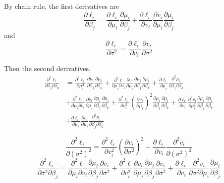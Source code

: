 \documentclass{article}
\begin{document}
\begin{enumerate}[leftmargin = 0 em, label = \arabic*., font = \bfseries]
	By chain rule, the first derivatives are
	\[\frac{\partial \ell_i}{\partial \beta_j} = \frac{\partial \ell_i}{\partial \mu_i} \frac{\partial \mu_i}{\partial \beta_j} + \frac{\partial \ell_i}{\partial v_i} \frac{\partial v_i}{\partial \mu_i} \frac{\partial \mu_i}{\partial \beta_j}\]
    and 
    \[\frac{\partial \ell_i}{\partial \sigma^2} = \frac{\partial \ell_i}{\partial v_i} \frac{\partial v_i}{\partial \sigma^2}\]

    Then the second derivatives,
    \begin{align*}
    \frac{\partial^2 \ell_i}{\partial \beta_j \partial \beta_k} &= \frac{\partial^2 \ell_i}{\partial \mu_i^2} \frac{\partial \mu_i}{\partial \beta_j} \frac{\partial \mu_i}{\partial \beta_k} + \frac{\partial^2 \ell}{\partial \mu_i \partial v_i} \frac{\partial v_i}{\partial \mu_i} \frac{\partial \mu_i}{\partial \beta_j} \frac{\partial \mu_i}{\partial \beta_k} + \frac{\partial \ell_i}{\partial \mu_i} \frac{\partial^2 \mu_i}{\partial \beta_j \partial \beta_k}\\
    & + \frac{\partial^2 \ell_{i}}{\partial \mu_i \partial v_i} \frac{\partial v_i}{\partial \mu_i} \frac{\partial \mu_i}{\partial \beta_j} \frac{\partial \mu_i}{\partial \beta_k} + \frac{\partial^2 \ell_{i}}{\partial v_i^2} \left(\frac{\partial v_i}{\partial \mu_i}\right)^2 \frac{\partial \mu_i}{\partial \beta_j} \frac{\partial \mu_i}{\partial \beta_k} + \frac{\partial \ell_i}{\partial v_i} \frac{\partial^2 v_i}{\partial \mu_i^2} \frac{\partial \mu_i}{\partial \beta_j} \frac{\partial \mu_i}{\partial \beta_k}\\
    & + \frac{\partial \ell_i}{\partial \mu_i} \frac{\partial v_i}{\partial \mu_i} \frac{\partial^2 \mu_i}{\partial \beta_j \partial \beta_k} 
    \end{align*}

    \[\frac{\partial^2 \ell_i}{\partial (\sigma^2)^2} = \frac{\partial^2 \ell_i}{\partial v_i^2} \left(\frac{\partial v_i}{\partial \sigma^2}\right)^2 + \frac{\partial \ell_i}{\partial v_i} \frac{\partial^2 v_i}{\partial (\sigma^2)^2}\]
    \[\frac{\partial^2 \ell_i}{\partial \sigma^2 \partial \beta_j} = \frac{\partial^2 \ell}{\partial \mu_i \partial v_i} \frac{\partial \mu_i}{\partial \beta_j}\frac{\partial v_i}{\partial \sigma^2} + \frac{\partial^2 \ell}{\partial v_i^2} \frac{\partial v_i}{\partial \mu_i}\frac{\partial \mu_i}{\partial \beta_j} \frac{\partial v_i}{\partial \sigma^2} + \frac{\partial \ell_i}{\partial v_i} \frac{\partial^2 v_i}{\partial \sigma^2 \partial \mu_i} \frac{\partial \mu_i}{\partial \beta_j}\]


\end{enumerate}
\end{document}
